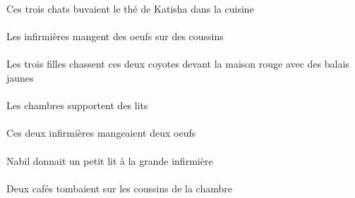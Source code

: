 \begin{exe}
Ces trois chats buvaient le thé de Katisha dans la cuisine
\ex\gll
\INDPlObl{}   \coussinAPlObl{}   \SUR{}   \DEFPlErg{}   \infirmiereBPlErg{}   \INDPlAbs{}   \oeufDPlAbs{}  \mangerVtPrsDPl{}\\
\INDPlOblP{}   \coussinAPlOblP{}   \SURP{}   \DEFPlErgP{}   \infirmiereBPlErgP{}   \INDPlAbsP{}   \oeufDPlAbsP{}  \mangerVtPrsDPlP{}\\
Les infirmières mangent des oeufs sur des coussins
\ex\gll
\INDPlObl{}   \jauneCPl{}   \balaiCPlObl{}   \AVEC{}   \DEFPlErg{}   \troisCPl{}   \filleCPlErg{}   \DEMDuAbs{}    \DEFSgObl{}   \rougeDSg{}   \maisonDSgObl{}   \DEVANT{}   \coyoteADuAbs{}  \chasserVtPrsADu{}\\
\INDPlOblP{}   \jauneCPlP{}   \balaiCPlOblP{}   \AVECP{}   \DEFPlErgP{}   \troisCPlP{}   \filleCPlErgP{}   \DEMDuAbsP{}    \DEFSgOblP{}   \rougeDSgP{}   \maisonDSgOblP{}   \DEVANTP{}   \coyoteADuAbsP{}  \chasserVtPrsADuP{}\\
Les trois filles chassent ces deux coyotes devant la maison rouge avec des balais jaunes
\ex\gll
\DEFPlErg{}   \chambreBPlErg{}   \INDPlAbs{}   \litDPlAbs{}  \supporterVtPrsDPl{}\\
\DEFPlErgP{}   \chambreBPlErgP{}   \INDPlAbsP{}   \litDPlAbsP{}  \supporterVtPrsDPlP{}\\
Les chambres supportent des lits
\ex\gll
\DEMDuErg{}   \infirmiereBDuErg{}   \INDDuAbs{}   \oeufDDuAbs{}  \mangerVtPstDDu{}\\
\DEMDuErgP{}   \infirmiereBDuErgP{}   \INDDuAbsP{}   \oeufDDuAbsP{}  \mangerVtPstDDuP{}\\
Ces deux infirmières mangeaient deux oeufs
\ex\gll
\INDSgErg{}   \NabilBSgErg{}    \DEFSgDat{}   \grandBSg{}   \infirmiereBSgDat{}   \INDSgAbs{}   \petitDSg{}   \litDSgAbs{}  \donnerVdPstDSg{}\\
\INDSgErgP{}   \NabilBSgErgP{}    \DEFSgDatP{}   \grandBSgP{}   \infirmiereBSgDatP{}   \INDSgAbsP{}   \petitDSgP{}   \litDSgAbsP{}  \donnerVdPstDSgP{}\\
Nabil donnait un petit lit à la grande infirmière
\ex\gll
\INDDuAbs{}   \cafeDDuAbs{}    \DEFPlObl{}    \DEFSgObl{}   \chambreBSgObl{}   \DE{}   \coussinAPlObl{}   \SUR{}  \tomberViPstDDu{}\\
\INDDuAbsP{}   \cafeDDuAbsP{}    \DEFPlOblP{}    \DEFSgOblP{}   \chambreBSgOblP{}   \DEP{}   \coussinAPlOblP{}   \SURP{}  \tomberViPstDDuP{}\\
Deux cafés tombaient sur les coussins de la chambre
\ex\gll
\INDSgAbs{}   \NicoleDSgAbs{}    \DEFPlObl{}    \DEFSgObl{}   \litDSgObl{}   \DE{}   \coussinAPlObl{}   \SUR{}  \tomberViPrsDSg{}\\

\end{exe}
